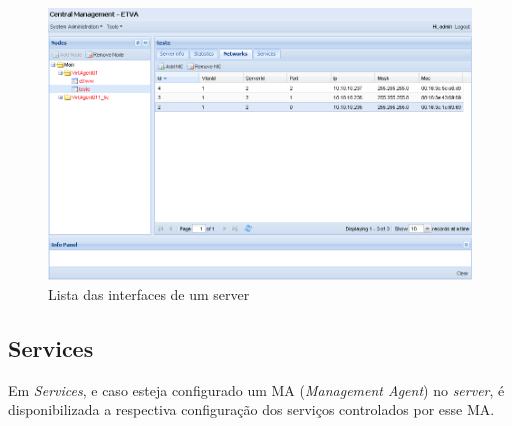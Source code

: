 \begin{figure}[H]
	\begin{center}
	\includegraphics[scale=0.5]{screenshots/server_networks.png}
	\caption{Lista das interfaces de um server}
	\label{fig:server_networks}
	\end{center}
\end{figure}



\subsection{Services}
Em \emph{Services}, e caso esteja configurado um MA (\emph{Management Agent}) no \emph{server}, é disponibilizada a respectiva configuração dos serviços controlados por esse MA.
